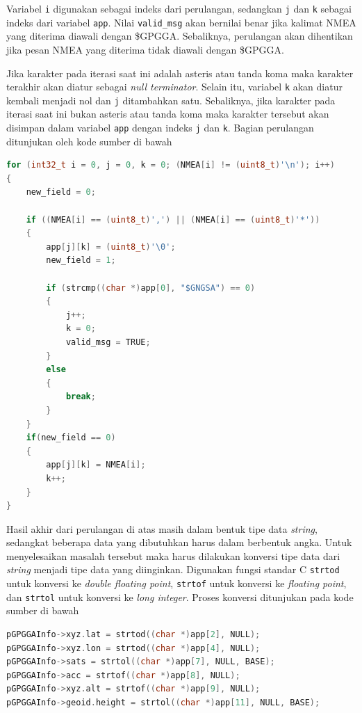 Variabel \texttt{i} digunakan sebagai indeks dari perulangan, sedangkan \texttt{j} dan \texttt{k} sebagai indeks dari variabel \texttt{app}. Nilai \texttt{valid\_msg} akan bernilai benar jika kalimat NMEA yang diterima diawali dengan \$GPGGA. Sebaliknya, perulangan akan dihentikan jika pesan NMEA yang diterima tidak diawali dengan  \$GPGGA.

Jika karakter pada iterasi saat ini adalah asteris atau tanda koma maka karakter terakhir akan diatur sebagai \textit{null terminator}. Selain itu, variabel \texttt{k} akan diatur kembali menjadi nol dan \texttt{j} ditambahkan satu. Sebaliknya, jika karakter pada iterasi saat ini bukan asteris atau tanda koma maka karakter tersebut akan disimpan dalam variabel \texttt{app} dengan indeks \texttt{j} dan \texttt{k}. Bagian perulangan ditunjukan oleh kode sumber di bawah

\begin{lstlisting}[language=c]
for (int32_t i = 0, j = 0, k = 0; (NMEA[i] != (uint8_t)'\n'); i++)
{
	new_field = 0;
	
	if ((NMEA[i] == (uint8_t)',') || (NMEA[i] == (uint8_t)'*'))
	{
		app[j][k] = (uint8_t)'\0';
		new_field = 1;
		
		if (strcmp((char *)app[0], "$GNGSA") == 0)
		{
			j++;
			k = 0;
			valid_msg = TRUE;
		}
		else
		{
			break;
		}
	}
	if(new_field == 0)
	{
		app[j][k] = NMEA[i];
		k++;
	}
}
\end{lstlisting}

Hasil akhir dari perulangan di atas masih dalam bentuk tipe data \textit{string}, sedangkat beberapa data yang dibutuhkan harus dalam berbentuk angka. Untuk menyelesaikan masalah tersebut maka harus dilakukan konversi tipe data dari \textit{string} menjadi tipe data yang diinginkan. Digunakan fungsi standar C \texttt{strtod} untuk konversi ke \textit{double floating point}, \texttt{strtof} untuk konversi ke \textit{floating point}, dan \texttt{strtol} untuk konversi ke \textit{long integer}. Proses konversi ditunjukan pada kode sumber di bawah

\begin{lstlisting}[language=c]
pGPGGAInfo->xyz.lat = strtod((char *)app[2], NULL);
pGPGGAInfo->xyz.lon = strtod((char *)app[4], NULL);
pGPGGAInfo->sats = strtol((char *)app[7], NULL, BASE);
pGPGGAInfo->acc = strtof((char *)app[8], NULL);
pGPGGAInfo->xyz.alt = strtof((char *)app[9], NULL);
pGPGGAInfo->geoid.height = strtol((char *)app[11], NULL, BASE);
\end{lstlisting}

